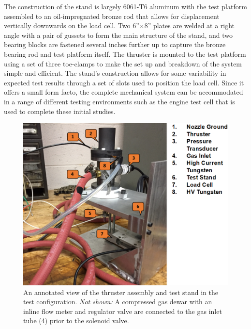 \documentclass[journal]{IEEEtran}
\begin{document}
The construction of the stand is largely 6061-T6 aluminum with the test platform assembled to an oil-impregnated bronze rod that allows for displacement vertically downwards on the load cell.
Two 6''$\times$8'' plates are welded at a right angle with a pair of gussets to form the main structure of the stand, and two bearing blocks are fastened several inches further up to capture the bronze bearing rod and test platform itself.
The thruster is mounted to the test platform using a set of three toe-clamps to make the set up and breakdown of the system simple and efficient.
The stand's construction allows for some variability in expected test results through a set of slots used to position the load cell. Since it offers a small form facto, the complete mechanical system can be accommodated in a range of different testing environments such as the engine test cell that is used to complete these initial studies.

\begin{figure}[htp]
  \includegraphics[width=\linewidth]{figs/teststand-annotated.PNG}
  \caption{An annotated view of the thruster assembly and test stand in the test configuration.
  \emph{Not shown:} A compressed gas dewar with an inline flow meter and regulator valve are connected to the gas inlet tube (4) prior to the solenoid valve.
\label{fig:teststand-annotated}
}
\end{figure}
\end{document}
